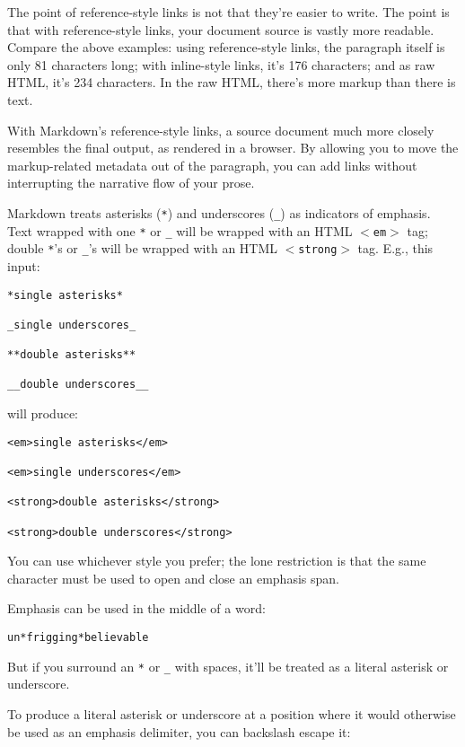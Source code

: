The point of reference-style links is not that they're easier to
write. The point is that with reference-style links, your document
source is vastly more readable. Compare the above examples: using
reference-style links, the paragraph itself is only 81 characters
long; with inline-style links, it's 176 characters; and as raw HTML,
it's 234 characters. In the raw HTML, there's more markup than there
is text.

With Markdown's reference-style links, a source document much more
closely resembles the final output, as rendered in a browser. By
allowing you to move the markup-related metadata out of the paragraph,
you can add links without interrupting the narrative flow of your
prose.

Markdown treats asterisks (\texttt{*}) and underscores (\texttt{\_}) as indicators of
emphasis. Text wrapped with one \texttt{*} or \texttt{\_} will be wrapped with an
HTML \texttt{$<$em$>$} tag; double \texttt{*}'s or \texttt{\_}'s will be wrapped with an HTML
\texttt{$<$strong$>$} tag. E.g., this input:

\begin{verbatim}
*single asterisks*

_single underscores_

**double asterisks**

__double underscores__
\end{verbatim}

will produce:

\begin{verbatim}
<em>single asterisks</em>

<em>single underscores</em>

<strong>double asterisks</strong>

<strong>double underscores</strong>
\end{verbatim}

You can use whichever style you prefer; the lone restriction is that
the same character must be used to open and close an emphasis span.

Emphasis can be used in the middle of a word:

\begin{verbatim}
un*frigging*believable
\end{verbatim}

But if you surround an \texttt{*} or \texttt{\_} with spaces, it'll be treated as a
literal asterisk or underscore.

To produce a literal asterisk or underscore at a position where it
would otherwise be used as an emphasis delimiter, you can backslash
escape it:

